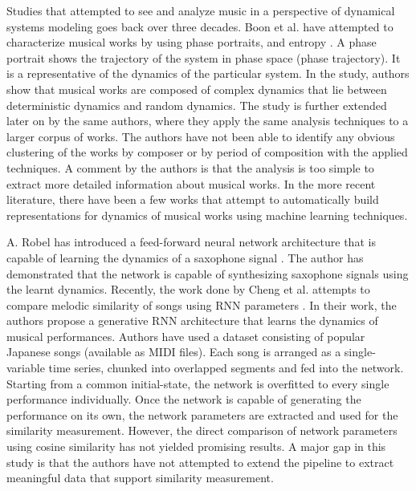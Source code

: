 \documentclass[../main.tex]{subfiles}
\begin{document}
\par
Studies that attempted to see and analyze music in a perspective of dynamical systems modeling goes back over three decades. Boon et al. have attempted to characterize musical works by using phase portraits, and entropy \cite{complex_dynamics}. A phase portrait shows the trajectory of the system in phase space (phase trajectory). It is a representative of the dynamics of the particular system. In the study,  authors show that musical works are composed of complex dynamics that lie between deterministic dynamics and random dynamics. The study is further extended later on by the same authors\cite{boonDynamicalSystemsTheory1995}, where they apply the same analysis techniques to a larger corpus of works. The authors have not been able to identify any obvious clustering of the works by composer or by period of composition with the applied techniques. A comment by the authors is that the analysis is too simple to extract more detailed information about musical works. In the more recent literature, there have been a few works that attempt to automatically build representations for dynamics of musical works using machine learning techniques.

\par
A. Robel has introduced a feed-forward neural network architecture that is capable of learning the dynamics of a saxophone signal \cite{robelNeuralNetworkModeling}. The author has demonstrated that the network is capable of synthesizing saxophone signals using the learnt dynamics. Recently, the work done by Cheng et al. attempts to compare melodic similarity of songs using \gls{RNN} parameters \cite{tian_cheng_comparing_2018}. In their work, the authors propose a generative \gls{RNN} architecture that learns the dynamics of  musical performances. Authors have used a dataset consisting of popular Japanese songs (available as MIDI files). Each song is arranged as a single-variable time series, chunked into overlapped segments and fed into the network. Starting from a common initial-state, the network is overfitted to every single performance individually. Once the network is capable of generating the performance on its own, the network parameters are extracted and used for the similarity measurement. However, the direct comparison of network parameters using cosine similarity has not yielded promising results. A major gap in this study is that the authors have not attempted to extend the pipeline to extract meaningful data that support similarity measurement.
\end{document}

